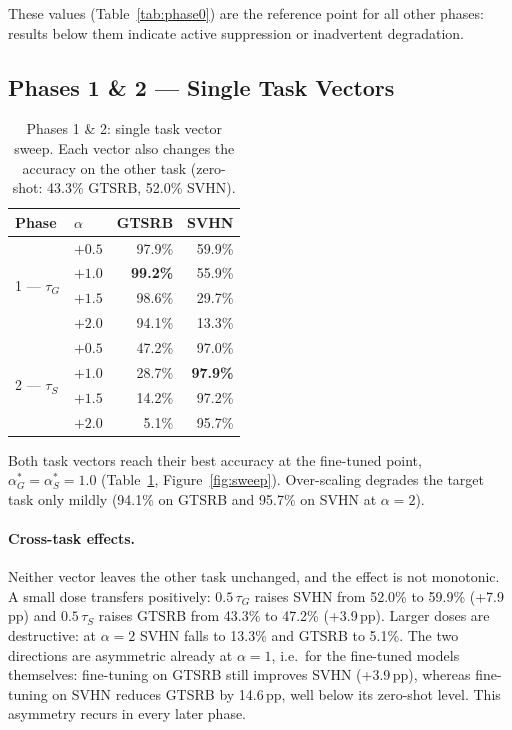 \documentclass[11pt,a4paper,twocolumn]{article}
\newcommand{\tG}{\tau_G}
\newcommand{\tS}{\tau_S}
\newcommand{\pp}{\,pp}
\begin{document}
These values (Table~\ref{tab:phase0}) are the reference point for all
other phases: results below them indicate active suppression or
inadvertent degradation.

\subsection{Phases 1 \& 2 --- Single Task Vectors}

\begin{table}[t]
\centering\small
\begin{tabular}{@{}llrr@{}}
\toprule
Phase & $\alpha$ & GTSRB & SVHN \\
\midrule
\multirow{4}{*}{1 --- $\tG$}
 & $+0.5$ & 97.9\% & 59.9\% \\
 & $+1.0$ & \textbf{99.2\%} & 55.9\% \\
 & $+1.5$ & 98.6\% & 29.7\% \\
 & $+2.0$ & 94.1\% & 13.3\% \\
\midrule
\multirow{4}{*}{2 --- $\tS$}
 & $+0.5$ & 47.2\% & 97.0\% \\
 & $+1.0$ & 28.7\% & \textbf{97.9\%} \\
 & $+1.5$ & 14.2\% & 97.2\% \\
 & $+2.0$ & 5.1\% & 95.7\% \\
\bottomrule
\end{tabular}
\caption{Phases 1 \& 2: single task vector sweep. Each vector also
changes the accuracy on the other task (zero-shot: 43.3\% GTSRB, 52.0\%
SVHN).}
\label{tab:phase12}
\end{table}

Both task vectors reach their best accuracy at the fine-tuned point,
$\alpha^*_G=\alpha^*_S=1.0$ (Table~\ref{tab:phase12}, Figure~\ref{fig:sweep}).
Over-scaling degrades the target task only mildly (94.1\% on GTSRB and
95.7\% on SVHN at $\alpha=2$).

\paragraph{Cross-task effects.} Neither vector leaves the other task
unchanged, and the effect is not monotonic. A small dose transfers
positively: $0.5\,\tG$ raises SVHN from 52.0\% to 59.9\% (+7.9\pp) and
$0.5\,\tS$ raises GTSRB from 43.3\% to 47.2\% (+3.9\pp). Larger doses are
destructive: at $\alpha=2$ SVHN falls to 13.3\% and GTSRB to 5.1\%. The
two directions are asymmetric already at $\alpha=1$, i.e.\ for the
fine-tuned models themselves: fine-tuning on GTSRB still improves SVHN
(+3.9\pp), whereas fine-tuning on SVHN reduces GTSRB by 14.6\pp, well
below its zero-shot level. This asymmetry recurs in every later phase.
\end{document}
